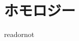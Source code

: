 \documentclass{jsarticle}
\begin{document}
\fi

\section{ホモロジー}

\expandafter\ifx\csname readornot\endcsname\relax
  
\end{document}
